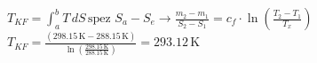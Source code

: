 \( T_{KF} = \int_{a}^{b} T \, dS \, \text{spez} \)  
\( S_a - S_e \rightarrow \frac{m_2 - m_1}{S_2 - S_1} = c_f \cdot \ln \left( \frac{T_2 - T_1}{T_x} \right) \)  
\( T_{KF} = \frac{(298.15 \, \text{K} - 288.15 \, \text{K})}{\ln \left( \frac{298.15 \, \text{K}}{288.15 \, \text{K}} \right)} = 293.12 \, \text{K} \)
